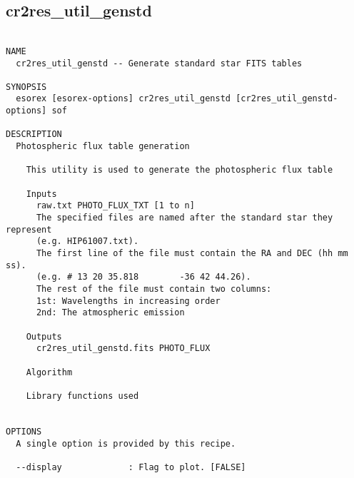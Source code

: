\subsection{cr2res\_util\_genstd}
\begin{verbatim}

NAME
  cr2res_util_genstd -- Generate standard star FITS tables

SYNOPSIS
  esorex [esorex-options] cr2res_util_genstd [cr2res_util_genstd-options] sof

DESCRIPTION
  Photospheric flux table generation                                      
                                                                          
    This utility is used to generate the photospheric flux table          
                                                                          
    Inputs                                                                
      raw.txt PHOTO_FLUX_TXT [1 to n]                      
      The specified files are named after the standard star they represent
      (e.g. HIP61007.txt).                                                
      The first line of the file must contain the RA and DEC (hh mm ss).  
      (e.g. # 13 20 35.818        -36 42 44.26).                          
      The rest of the file must contain two columns:                      
      1st: Wavelengths in increasing order                                
      2nd: The atmospheric emission                                       
                                                                          
    Outputs                                                               
      cr2res_util_genstd.fits PHOTO_FLUX                
                                                                          
    Algorithm                                                             
                                                                          
    Library functions used                                                
  

OPTIONS
  A single option is provided by this recipe.

  --display             : Flag to plot. [FALSE]

\end{verbatim}
